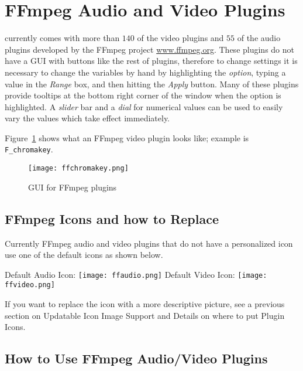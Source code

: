 \section[FFmpeg Audio and Video Plugins]{FFmpeg Audio and Video Plugins}%
\label{sec:ffmpeg_audio_video_plugins}

\CGGI{} currently comes with more than $140$ of the video plugins and $55$ of the audio plugins developed by the FFmpeg project {\small \url{www.ffmpeg.org}}. These plugins do not have a GUI with buttons like the rest of plugins, therefore to change settings it is necessary to change the variables by hand by highlighting the \textit{option}, typing a value in the \textit{Range} box, and then hitting the \textit{Apply} button. Many of these plugins provide tooltips at the bottom right corner of the window when the option is highlighted. A \textit{slider} bar and a \textit{dial} for numerical values can be used to easily vary the values which take effect immediately.

Figure~\ref{fig:ffchromakey} shows what an FFmpeg video plugin looks like; example is \texttt{F\_chromakey}.

\begin{figure}[htpb]
    \centering
    \texttt{[image: ffchromakey.png]}
    \caption{GUI for FFmpeg plugins}
    \label{fig:ffchromakey}
\end{figure}

\subsection{FFmpeg Icons and how to Replace}%
\label{sub:ffmpeg_icons_how_replace}

Currently FFmpeg audio and video plugins that do not have a personalized icon use one of the default icons as shown below.

Default Audio Icon: \quad \texttt{[image: ffaudio.png]}
\quad Default Video Icon: \quad \texttt{[image: ffvideo.png]}

If you want to replace the icon with a more descriptive picture, see a previous section on Updatable Icon Image Support and Details on where to put Plugin Icons.

\subsection{How to Use FFmpeg Audio/Video Plugins}%
\label{sub:use_ffmpeg_audio_video_plugins}

